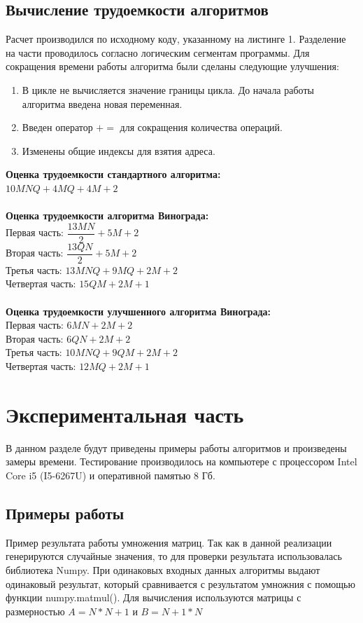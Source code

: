 \documentclass[12pt]{article}
\begin{document}
\subsection{Вычисление трудоемкости алгоритмов}
Расчет производился по исходному коду, указанному на листинге 1. Разделение на части проводилось согласно логическим сегментам программы. Для сокращения времени работы алгоритма были сделаны следующие улучшения: 
\begin{enumerate}
	\item В цикле не вычисляется значение границы цикла. До начала работы алгоритма введена новая переменная.
	\item Введен оператор $+=$ для сокращения количества операций.
	\item Изменены общие индексы для взятия адреса.
	\end{enumerate}
\textbf{Оценка трудоемкости стандартного алгоритма:}
\\$10MNQ+4MQ+4M+2$
\\
\\\textbf{Оценка трудоемкости алгоритма Винограда:}
\\Первая часть: $\dfrac{13MN}{2}+5M+2$ \\
Вторая часть: $\dfrac{13QN}{2}+5M+2$ \\
Третья часть: $13MNQ+9MQ+2M+2$ \\
Четвертая часть: $15QM+2M+1$ \\
\\\textbf{Оценка трудоемкости улучшенного алгоритма Винограда:}
\\Первая часть: $6MN+2M+2$ \\
Вторая часть: $6QN+2M+2$ \\
Третья часть: $10MNQ+9QM+2M+2$ \\
Четвертая часть: $12MQ + 2M + 1$ \\

\newpage
\newpage

\section{Экспериментальная часть}
В данном разделе будут приведены примеры работы алгоритмов и произведены замеры времени. Тестирование производилось на компьютере с процессором Intel Core i5 (I5-6267U) и оперативной памятью 8 Гб. 
\subsection{Примеры работы}
Пример результата работы умножения матриц. Так как в данной реализации генерируются случайные значения, то для проверки результата использовалась библиотека Numpy. При одинаковых входных данных алгоритмы выдают одинаковый результат, который сравнивается с результатом умножния с помощью функции numpy.matmul(). Для вычисления используются матрицы с размерностью $A = N*N+1$ и $B = N+1*N$ 
\newline
\end{document}
